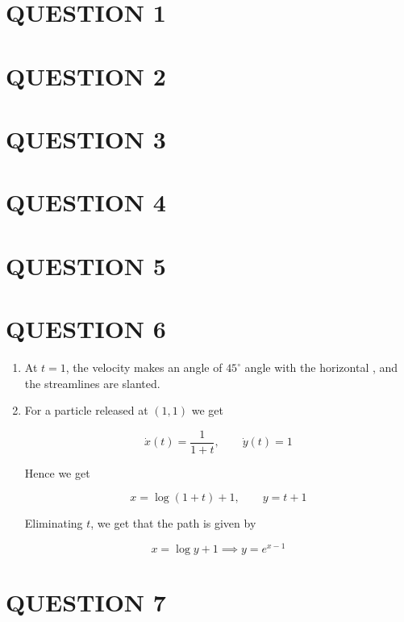 \documentclass[a4paper]{article}
\begin{document}
	
\maketitle

\section{QUESTION 1}
\section{QUESTION 2}
\section{QUESTION 3}
\section{QUESTION 4}
\section{QUESTION 5}



\section{QUESTION 6}

\begin{enumerate}
	\item At $ t = 1 $, the velocity makes an angle of $ 45^\circ $ angle with the horizontal , and the streamlines are slanted.
	
	\item For a particle released at $ (1,1) $ we get
	
	\[ \dot{x}(t) = \frac{1}{1+t}, \qquad \dot{y}(t) = 1  \]
	
	Hence we get 
	
	\[ x = \log(1+t) + 1, \qquad y = t + 1 \]
	
	Eliminating $ t $, we get that the path is given by
	
	\[ x = \log y + 1 \implies y = e^{x-1} \]
	
	
	
\end{enumerate}



\section{QUESTION 7}
\end{document}
